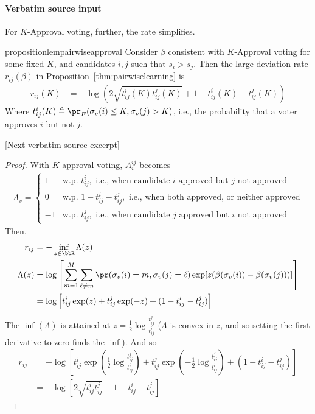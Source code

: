\documentclass[10pt]{article}
\begin{document}
\paragraph{Verbatim source input}
\begin{ReviewVerbatim}
For $K$-Approval voting, further, the rate simplifies.





%



\begin{restatable}{proposition}{lempairwiseapproval}
	\label{lem:pairwiselearning_approval}
	Consider $\beta$ consistent with $K$-Approval voting for some fixed $K$, and candidates $i,j$ such that $s_i > s_j$. Then the large deviation rate $r_{ij}(\beta)$ in Proposition~\ref{thm:pairwiselearning} is
	\begin{align*}
	r_{ij}(K) &= -\log\left( 2\sqrt{t_{ij}^i(K)t_{ij}^j(K)} + 1 - t_{ij}^i(K) - t_{ij}^j(K) \right)
	\end{align*}
	Where $t^i_{ij}(K) \triangleq \pr_F(\sigma_v(i) \leq K, \sigma_v(j) > K)$, i.e., the probability that a voter approves $i$ but not $j$.
%
\end{restatable}

[Next verbatim source excerpt]

\lempairwiseapproval*
\begin{proof}
	With $K$-approval voting, $A^{ij}_v$ becomes
	\begin{align*}
	A_v = \begin{cases}
	1 & \text{w.p. } t^i_{ij}, \text{ i.e., when candidate $i$ approved but $j$ not approved}\\
	0 & \text{w.p. } 1-t^i_{ij} - t^j_{ij}, \text{ i.e., when both approved, or neither approved}\\
	-1 & \text{w.p. } t^j_{ij}, \text{ i.e., when candidate $j$ approved but $i$ not approved}
	\end{cases}
	\end{align*}
Then,
	\begin{align*}
r_{ij} &= -\inf_{z\in\bbR}{\Lambda(z)}\\
\Lambda(z) &= \log \left[\sum_{m=1}^M \sum_{\ell\neq m} \pr(\sigma_v(i) = m, \sigma_v(j)=\ell) \exp[ z(\beta(\sigma_v(i)) - \beta(\sigma_v(j)))]   \right]\\
 &= \log \left[t_{ij}^i \exp(z) + t_{ij}^j \exp(-z) + (1 - t_{ij}^i - t_{ij}^j)\right]
\end{align*}
The $\inf(\Lambda)$ is attained at $z = \frac{1}{2} \log\frac{t_{ij}^j}{t_{ij}^i}$ ($\Lambda$ is convex in $z$, and so setting the first derivative to zero finds the $\inf$).
And so
\begin{align*}
r_{ij} &= -\log\left[ t_{ij}^i \exp\left(\frac{1}{2} \log\frac{t_{ij}^j}{t_{ij}^i}\right) + t_{ij}^j \exp\left(-\frac{1}{2} \log\frac{t_{ij}^j}{t_{ij}^i}\right) + (1 - t_{ij}^i - t_{ij}^j) \right]\\
&= -\log\left[ 2\sqrt{t_{ij}^it_{ij}^j} + 1 - t_{ij}^i - t_{ij}^j \right]
	\end{align*}
\end{proof}
\end{ReviewVerbatim}
\end{document}
